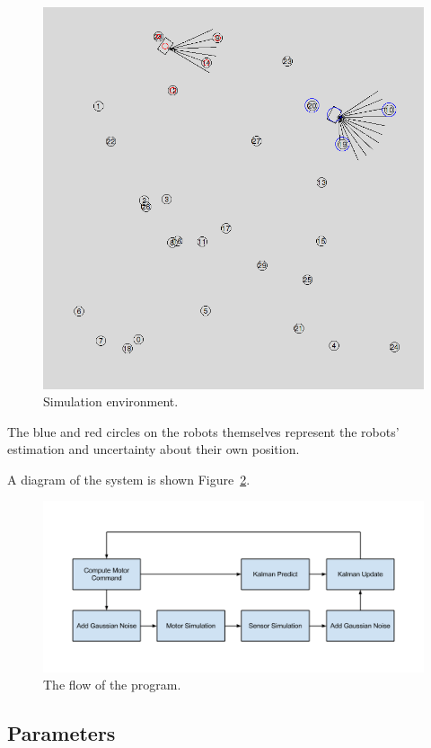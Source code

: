 \documentclass[prodmode,acmtecs]{acmsmall} %
\begin{document}
\begin{figure}[h!]
\includegraphics[width=\textwidth]{screenshot.png}
\caption{Simulation environment.}
\label{fig:simulation}
\end{figure}

The blue and red circles on the robots themselves represent the robots' estimation and uncertainty about their own position.

A diagram of the system is shown Figure~\ref{fig:system}.

\begin{figure}[h!]
\includegraphics[width=\textwidth]{systemdiagram.png}
\caption{The flow of the program.}
\label{fig:system}
\end{figure}

\subsection{Parameters}
\end{document}
